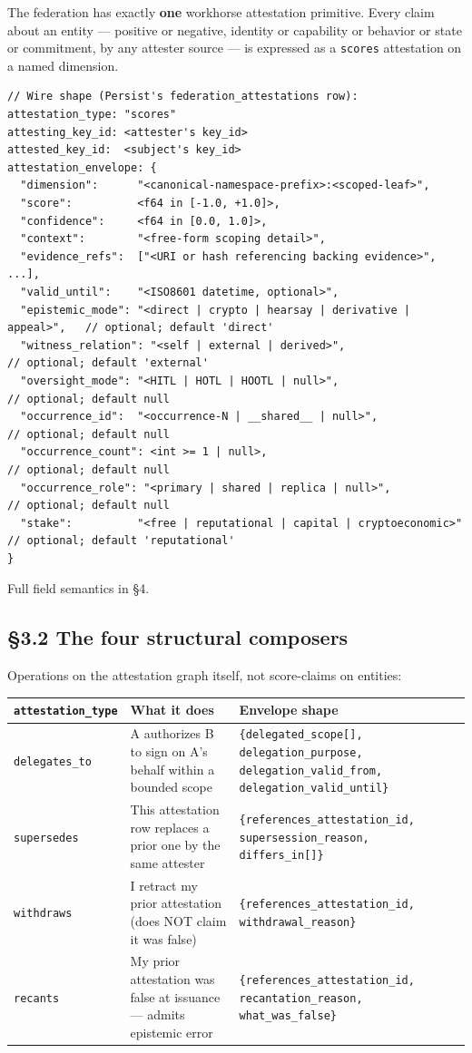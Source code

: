\documentclass[11pt]{article}
\begin{document}
The federation has exactly \textbf{one} workhorse attestation primitive. Every claim about an entity — positive or negative, identity or capability or behavior or state or commitment, by any attester source — is expressed as a \texttt{scores} attestation on a named dimension.


\begin{lstlisting}
// Wire shape (Persist's federation_attestations row):
attestation_type: "scores"
attesting_key_id: <attester's key_id>
attested_key_id:  <subject's key_id>
attestation_envelope: {
  "dimension":      "<canonical-namespace-prefix>:<scoped-leaf>",
  "score":          <f64 in [-1.0, +1.0]>,
  "confidence":     <f64 in [0.0, 1.0]>,
  "context":        "<free-form scoping detail>",
  "evidence_refs":  ["<URI or hash referencing backing evidence>", ...],
  "valid_until":    "<ISO8601 datetime, optional>",
  "epistemic_mode": "<direct | crypto | hearsay | derivative | appeal>",   // optional; default 'direct'
  "witness_relation": "<self | external | derived>",                       // optional; default 'external'
  "oversight_mode": "<HITL | HOTL | HOOTL | null>",                        // optional; default null
  "occurrence_id":  "<occurrence-N | __shared__ | null>",                  // optional; default null
  "occurrence_count": <int >= 1 | null>,                                    // optional; default null
  "occurrence_role": "<primary | shared | replica | null>",                // optional; default null
  "stake":          "<free | reputational | capital | cryptoeconomic>"     // optional; default 'reputational'
}
\end{lstlisting}

Full field semantics in §4.


\subsection*{§3.2 The four structural composers}


Operations on the attestation graph itself, not score-claims on entities:


{\footnotesize
\begin{longtable}{|p{5.33cm}|p{5.33cm}|p{5.33cm}|}\hline
\textbf{\texttt{attestation\_type}} & \textbf{What it does} & \textbf{Envelope shape} \\ \hline\endhead
\texttt{delegates\_to} & A authorizes B to sign on A's behalf within a bounded scope & \texttt{\{delegated\_scope[], delegation\_purpose, delegation\_valid\_from, delegation\_valid\_until\}} \\ \hline
\texttt{supersedes} & This attestation row replaces a prior one by the same attester & \texttt{\{references\_attestation\_id, supersession\_reason, differs\_in[]\}} \\ \hline
\texttt{withdraws} & I retract my prior attestation (does NOT claim it was false) & \texttt{\{references\_attestation\_id, withdrawal\_reason\}} \\ \hline
\texttt{recants} & My prior attestation was false at issuance — admits epistemic error & \texttt{\{references\_attestation\_id, recantation\_reason, what\_was\_false\}} \\ \hline
\end{longtable}}
\end{document}
